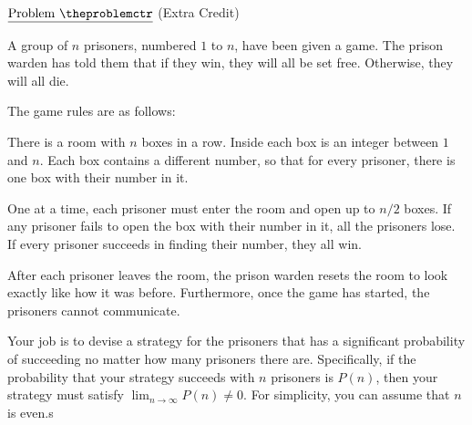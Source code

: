 \documentclass[11pt]{article}
\def\pp{\par\noindent}
\begin{document}
\pagebreak

\addtocounter{problemctr}{1}
\bigskip
\noindent
$\underline{\rm Problem\ \theproblemctr}$ (Extra Credit)\pp
\noindent

\noindent
A group of $n$ prisoners, numbered $1$ to $n$, have been given a game. The prison warden has told them that if they win, they will all be set free. Otherwise, they will all die.

\bigskip
The game rules are as follows:

\bigskip
There is a room with $n$ boxes in a row. Inside each box is an integer between $1$ and $n$. Each box contains a different number, so that for every prisoner, there is one box with their number in it.

\bigskip
One at a time, each prisoner must enter the room and open up to $n/2$ boxes. If any prisoner fails to open the box with their number in it, all the prisoners lose. If every prisoner succeeds in finding their number, they all win.

\bigskip
After each prisoner leaves the room, the prison warden resets the room to look exactly like how it was before. Furthermore, once the game has started, the prisoners cannot communicate.

\bigskip
\bigskip
\noindent
Your job is to devise a strategy for the prisoners that has a significant probability of succeeding no matter how many prisoners there are. Specifically, if the probability that your strategy succeeds with $n$ prisoners is $P(n)$, then your strategy must satisfy $\lim_{n\rightarrow\infty} P(n) \neq 0$. For simplicity, you can assume that $n$ is even.s
\end{document}
